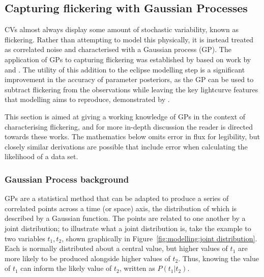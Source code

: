 \subsection{Capturing flickering with Gaussian Processes}

CVs almost always display some amount of stochastic variability, known as flickering. Rather than attempting to model this physically, it is instead treated as correlated noise and characterised with a Gaussian process (GP).
The application of GPs to capturing flickering was established by \citet{McAllister2017} based on work by \citet{roberts2012} and \citet{gibson2012}.
The utility of this addition to the eclipse modelling step is a significant improvement in the accuracy of parameter posteriors, as the GP can be used to subtract flickering from the observations while leaving the key lightcurve features that modelling aims to reproduce, demonstrated by \citet{McAllister2017}.

This section is aimed at giving a working knowledge of GPs in the context of characterising flickering, and for more in-depth discussion the reader is directed towards these works. The mathematics below omits error in flux for legibility, but closely similar derivations are possible that include error when calculating the likelihood of a data set.

\subsubsection{Gaussian Process background}
\label{sect:modelling:GP background}

GPs are a statistical method that can be adapted to produce a series of correlated points across a time (or space) axis, the distribution of which is described by a Gaussian function. The points are related to one another by a joint distribution; to illustrate what a joint distribution is, take the example to two variables $t_1, t_2$, shown graphically in Figure~\ref{fig:modelling:joint distribution}. Each is normally distributed about a central value, but higher values of $t_1$ are more likely to be produced alongside higher values of $t_2$. Thus, knowing the value of $t_1$ can inform the likely value of $t_2$, written as $P(t_1 | t_2)$.


